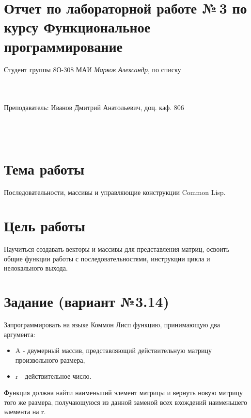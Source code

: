 \documentclass[12pt]{article}
\begin{document}
\section*{Отчет по лабораторной работе №\,3
по курсу \guillemotleft  Функциональное программирование\guillemotright}
\begin{flushright}
Студент группы 8О-308 МАИ \textit{Марков Александр},  по списку \\
 \\
 \\
\ \\
Преподаватель: Иванов Дмитрий Анатольевич, доц. каф. 806 \\
 \\
 \\
 \\

\end{flushright}

\section{Тема работы}
Последовательности, массивы и управляющие конструкции Common Lisp.

\section{Цель работы}
Научиться создавать векторы и массивы для представления матриц, освоить общие функции работы с последовательностями, инструкции цикла и нелокального выхода.

\section{Задание (вариант №3.14)}
Запрограммировать на языке Коммон Лисп функцию, принимающую два аргумента:

\begin{itemize}
    \item A - двумерный массив, представляющий действительную матрицу произвольного размера,
    \item r - действительное число.
\end{itemize}

Функция должна найти наименьший элемент матрицы и вернуть новую матрицу того же размера, получающуюся из данной заменой всех вхождений наименьшего элемента на r.
\end{document}

